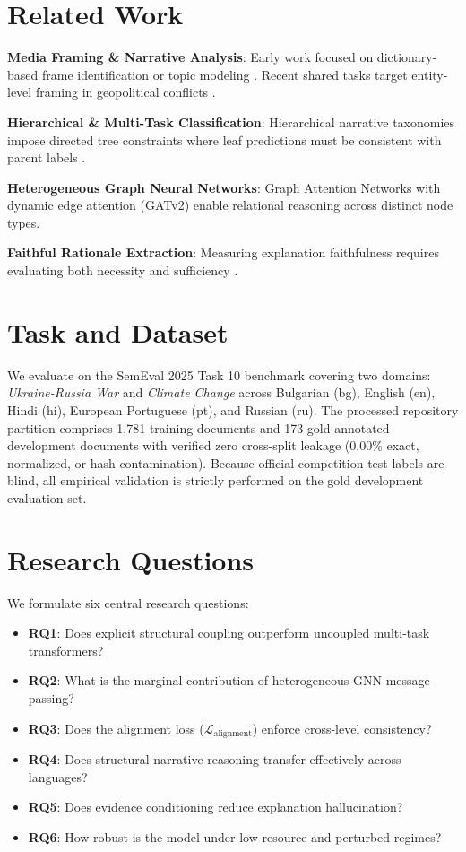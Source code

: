 \documentclass[11pt,a4paper]{article}
\begin{document}
\section{Related Work}
\textbf{Media Framing \& Narrative Analysis}: Early work focused on dictionary-based frame identification or topic modeling \citep{card2015media}. Recent shared tasks target entity-level framing in geopolitical conflicts \citep{nakov2023detecting, piskorski2025semeval}.

\textbf{Hierarchical \& Multi-Task Classification}: Hierarchical narrative taxonomies impose directed tree constraints where leaf predictions must be consistent with parent labels \citep{silla2011survey}.

\textbf{Heterogeneous Graph Neural Networks}: Graph Attention Networks with dynamic edge attention (GATv2) \citep{brody2022attentive} enable relational reasoning across distinct node types.

\textbf{Faithful Rationale Extraction}: Measuring explanation faithfulness requires evaluating both necessity and sufficiency \citep{deyoung2020eraser, wiegreffe2019attention, lewis2020retrieval}.

\section{Task and Dataset}
We evaluate on the SemEval 2025 Task 10 benchmark \citep{piskorski2025semeval} covering two domains: \textit{Ukraine-Russia War} and \textit{Climate Change} across Bulgarian (bg), English (en), Hindi (hi), European Portuguese (pt), and Russian (ru). The processed repository partition comprises 1,781 training documents and 173 gold-annotated development documents with verified zero cross-split leakage (0.00\% exact, normalized, or hash contamination). Because official competition test labels are blind, all empirical validation is strictly performed on the gold development evaluation set.

\section{Research Questions}
We formulate six central research questions:
\begin{itemize}
    \item \textbf{RQ1}: Does explicit structural coupling outperform uncoupled multi-task transformers?
    \item \textbf{RQ2}: What is the marginal contribution of heterogeneous GNN message-passing?
    \item \textbf{RQ3}: Does the alignment loss ($\mathcal{L}_{\text{alignment}}$) enforce cross-level consistency?
    \item \textbf{RQ4}: Does structural narrative reasoning transfer effectively across languages?
    \item \textbf{RQ5}: Does evidence conditioning reduce explanation hallucination?
    \item \textbf{RQ6}: How robust is the model under low-resource and perturbed regimes?
\end{itemize}
\end{document}
